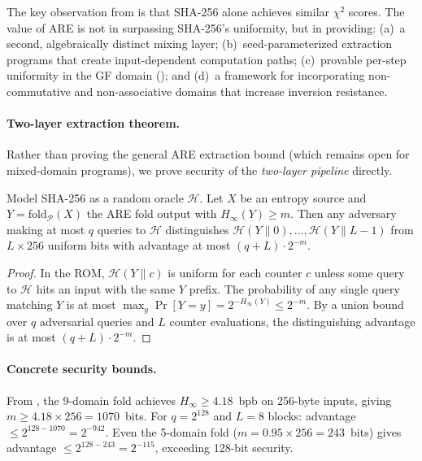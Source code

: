 \documentclass[sigconf,anonymous,review]{acmart}
\theoremstyle{acmdefinition}%
\theoremstyle{acmplain}%
\newcommand{\are}{\textsc{ARE}\xspace}
\newcommand{\minentropy}{H_{\infty}}
\begin{document}
The key observation from  is that SHA-256
alone achieves similar $\chi^2$ scores.
%
The value of \are is not in surpassing SHA-256's uniformity, but
in providing:
(a)~a second, algebraically distinct mixing layer;
(b)~seed-parameterized extraction programs that create
    input-dependent computation paths;
(c)~provable per-step uniformity in the GF domain
    ();
and (d)~a framework for incorporating non-commutative and
    non-associative domains that increase inversion resistance.

\paragraph{Two-layer extraction theorem.}
Rather than proving the general ARE extraction bound (which remains open for mixed-domain programs), we prove security of the \emph{two-layer pipeline} directly.

\begin{theorem}
\label{thm:two-layer}
Model SHA-256 as a random oracle $\mathcal{H}$.
Let $X$ be an entropy source and $Y = \mathrm{fold}_{\mathcal{P}}(X)$ the ARE fold output with $\minentropy(Y) \geq m$.
Then any adversary making at most $q$ queries to $\mathcal{H}$ distinguishes $\mathcal{H}(Y \| 0), \ldots, \mathcal{H}(Y \| L{-}1)$ from $L \times 256$ uniform bits with advantage at most $(q + L) \cdot 2^{-m}$.
\end{theorem}

\begin{proof}
In the ROM, $\mathcal{H}(Y \| c)$ is uniform for each counter $c$ unless some query to $\mathcal{H}$ hits an input with the same $Y$ prefix.
The probability of any single query matching $Y$ is at most $\max_y \Pr[Y = y] = 2^{-\minentropy(Y)} \leq 2^{-m}$.
By a union bound over $q$ adversarial queries and $L$ counter evaluations, the distinguishing advantage is at most $(q + L) \cdot 2^{-m}$.
\end{proof}

\paragraph{Concrete security bounds.}
From , the 9-domain fold achieves $\minentropy \geq 4.18$~bpb on 256-byte inputs, giving $m \geq 4.18 \times 256 = 1070$~bits.
For $q = 2^{128}$ and $L = 8$ blocks: advantage $\leq 2^{128-1070} = 2^{-942}$.
Even the 5-domain fold ($m = 0.95 \times 256 = 243$~bits) gives advantage $\leq 2^{128-243} = 2^{-115}$, exceeding 128-bit security.
\end{document}
